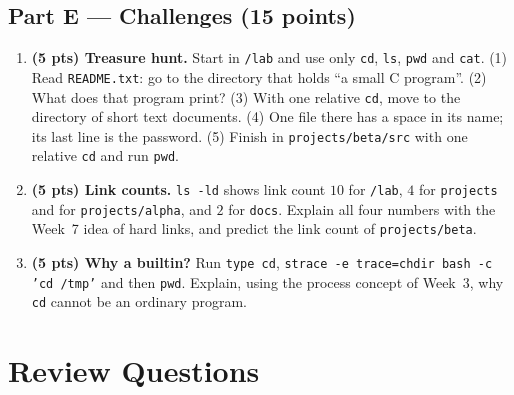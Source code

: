 \documentclass[11pt,a4paper]{article}
\newcommand{\cmd}[1]{\texttt{#1}}
\begin{document}
\subsection*{Part E --- Challenges (15 points)}
\begin{enumerate}[label=\textbf{E\arabic*}, leftmargin=2.2em, start=16]
  \item \textbf{(5 pts) Treasure hunt.} Start in \texttt{\tl/lab} and use only \cmd{cd}, \cmd{ls}, \cmd{pwd} and \cmd{cat}. (1) Read \texttt{README.txt}: go to the directory that holds ``a small C program''. (2) What does that program print? (3) With one relative \cmd{cd}, move to the directory of short text documents. (4) One file there has a space in its name; its last line is the password. (5) Finish in \texttt{projects/beta/src} with one relative \cmd{cd} and run \cmd{pwd}.
  \item \textbf{(5 pts) Link counts.} \cmd{ls -ld} shows link count $10$ for \texttt{\tl/lab}, $4$ for \texttt{projects} and for \texttt{projects/alpha}, and $2$ for \texttt{docs}. Explain all four numbers with the Week~7 idea of hard links, and predict the link count of \texttt{projects/beta}.
  \item \textbf{(5 pts) Why a builtin?} Run \cmd{type cd}, \cmd{strace -e trace=chdir bash -c 'cd /tmp'} and then \cmd{pwd}. Explain, using the process concept of Week~3, why \cmd{cd} cannot be an ordinary program.
\end{enumerate}

\section{Review Questions}
\end{document}
